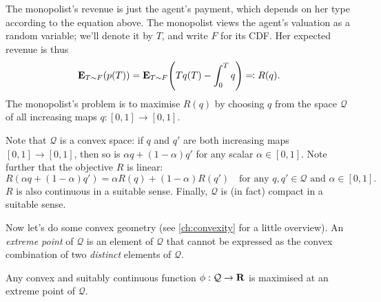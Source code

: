 The monopolist's revenue is just the agent's payment, which depends on her type according to the equation above.
The monopolist views the agent's valuation as a random variable; we'll denote it by $T$, and write $F$ for its CDF.
Her expected revenue is thus
%
\begin{equation*}
	\E_{T \sim F}( p(T) )
	= \E_{T \sim F}\left( T q(T) - \int_0^T q \right)
	\eqqcolon R(q) .
\end{equation*}
%
The monopolist's problem is to maximise $R(q)$
by choosing $q$ from the space $\mathcal{Q}$ of all increasing maps $q : [0,1] \to [0,1]$.

Note that $\mathcal{Q}$ is a convex space: if $q$ and $q'$ are both increasing maps $[0,1] \to [0,1]$, then so is $\alpha q + (1-\alpha) q'$ for any scalar $\alpha \in [0,1]$.
Note further that the objective $R$ is linear:
%
\begin{equation*}
	R( \alpha q + (1-\alpha) q' ) = \alpha R(q) + (1-\alpha) R(q') 
	\quad \text{for any $q,q' \in \mathcal{Q}$ and $\alpha \in [0,1]$.}
\end{equation*}
%
$R$ is also continuous in a suitable sense.
Finally, $\mathcal{Q}$ is (in fact) compact in a suitable sense.

Now let's do some convex geometry (see \cref{ch:convexity} for a little overview).
An \emph{extreme point} of $\mathcal{Q}$ is an element of $\mathcal{Q}$ that cannot be expressed as the convex combination of two \emph{distinct} elements of $\mathcal{Q}$.

\begin{observation}
	\label{observation:bauer}
	Any convex and suitably continuous function $\phi : \mathcal{Q} \to \mathbf{R}$
	is maximised at an extreme point of $\mathcal{Q}$.
\end{observation}

